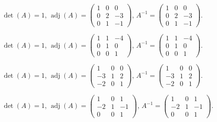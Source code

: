 \documentclass[12pt]{article}
\theoremstyle{remark}
\newcommand{\adj}{\operatorname{adj}}
\begin{document}
\begin{description}[style=nextline,leftmargin=3em,itemsep=0.45em]
\item[E193.] $\det(A)=1$, $\adj(A)=\begin{pmatrix}1&0&0\\0&2&-3\\0&1&-1\end{pmatrix}$, $A^{-1}=\begin{pmatrix}1&0&0\\0&2&-3\\0&1&-1\end{pmatrix}$.
\item[E194.] $\det(A)=1$, $\adj(A)=\begin{pmatrix}1&1&-4\\0&1&0\\0&0&1\end{pmatrix}$, $A^{-1}=\begin{pmatrix}1&1&-4\\0&1&0\\0&0&1\end{pmatrix}$.
\item[E195.] $\det(A)=1$, $\adj(A)=\begin{pmatrix}1&0&0\\-3&1&2\\-2&0&1\end{pmatrix}$, $A^{-1}=\begin{pmatrix}1&0&0\\-3&1&2\\-2&0&1\end{pmatrix}$.
\item[E196.] $\det(A)=1$, $\adj(A)=\begin{pmatrix}1&0&1\\-2&1&-1\\0&0&1\end{pmatrix}$, $A^{-1}=\begin{pmatrix}1&0&1\\-2&1&-1\\0&0&1\end{pmatrix}$.
\end{description}
\end{document}
